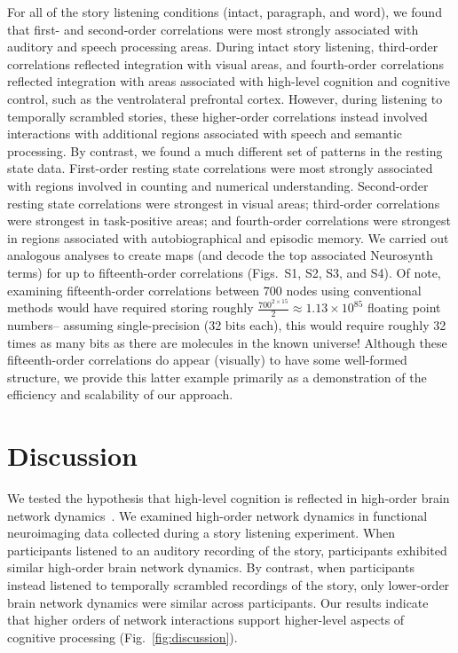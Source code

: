 \documentclass[english]{article}
\newcommand{\intact}{S1}
\newcommand{\para}{S2}
\newcommand{\word}{S3}
\newcommand{\rest}{S4}
\begin{document}
For all of the story listening conditions (intact, paragraph, and
word), we found that first- and second-order correlations were most
strongly associated with auditory and speech processing areas.  During
intact story listening, third-order correlations reflected integration
with visual areas, and fourth-order correlations reflected integration
with areas associated with high-level cognition and cognitive control,
such as the ventrolateral prefrontal cortex.  However, during
listening to temporally scrambled stories, these higher-order
correlations instead involved interactions with additional regions
associated with speech and semantic processing.  By contrast, we found
a much different set of patterns in the resting state data.
First-order resting state correlations were most strongly associated
with regions involved in counting and numerical understanding.
Second-order resting state correlations were strongest in visual
areas; third-order correlations were strongest in task-positive areas;
and fourth-order correlations were strongest in regions associated
with autobiographical and episodic memory.  We carried out analogous
analyses to create maps (and decode the top associated Neurosynth
terms) for up to fifteenth-order correlations (Figs.~\intact, \para, \word, and
\rest).  Of note, examining fifteenth-order correlations between 700
nodes using conventional methods would have required storing roughly
$\frac{700^{2 \times 15}}{2} \approx 1.13 \times 10^{85}$ floating
point numbers-- assuming single-precision (32 bits each), this would
require roughly 32 times as many bits as there are molecules in the
known universe!  Although these fifteenth-order correlations do appear
(visually) to have some well-formed structure, we provide this latter
example primarily as a demonstration of the efficiency and scalability
of our approach.






\section*{Discussion}
We tested the hypothesis that high-level cognition is reflected in
high-order brain network dynamics~\citep[e.g., see][]{SoloEtal19,
  ReimEtal17}.  We examined high-order network dynamics in functional
neuroimaging data collected during a story listening experiment.  When
participants listened to an auditory recording of the story,
participants exhibited similar high-order brain network dynamics.  By
contrast, when participants instead listened to temporally scrambled
recordings of the story, only lower-order brain network dynamics were
similar across participants.  Our results indicate that higher orders
of network interactions support higher-level aspects of cognitive
processing (Fig.~\ref{fig:discussion}).
\end{document}
